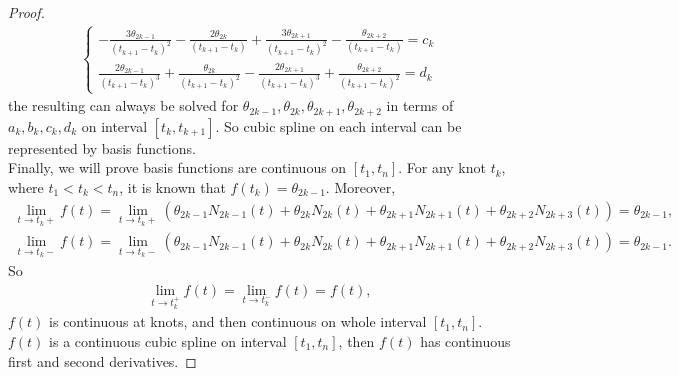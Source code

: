 \begin{proof}
\begin{align*}
\begin{cases}
-\frac{3\theta_{2k-1}}{(t_{k+1}-t_{k})^2} -\frac{2\theta_{2k}}{(t_{k+1}-t_{k})} +\frac{3\theta_{2k+1}}{(t_{k+1}-t_{k})^2} - \frac{\theta_{2k+2}}{(t_{k+1}-t_{k})}=c_k\\
\frac{2\theta_{2k-1}}{(t_{k+1}-t_{k})^3} +\frac{\theta_{2k}}{(t_{k+1}-t_{k})^2} -\frac{2\theta_{2k+1}}{(t_{k+1}-t_{k})^3} +\frac{\theta_{2k+2}}{(t_{k+1}-t_{k})^2}=d_k
\end{cases}
\end{align*}
the resulting can always be solved for $\theta_{2k-1}, \theta_{2k},\theta_{2k+1},\theta_{2k+2}$ in terms of $a_k,b_k,c_k,d_k$ on interval $[t_k, t_{k+1}]$. So cubic spline on each interval can be represented by basis functions. \\

Finally, we will prove basis functions are continuous on $[t_1, t_n]$. For any knot $t_k$, where $t_1< t_k <t_n$, it is known that $f(t_k)=\theta_{2k-1}$. Moreover, 
\begin{align*}
\lim\limits_{t\rightarrow t_k+} f(t) = \lim\limits_{t\rightarrow t_k+} (\theta_{2k-1}N_{2k-1}(t)+\theta_{2k}N_{2k}(t)+\theta_{2k+1}N_{2k+1}(t)+\theta_{2k+2}N_{2k+3}(t))=\theta_{2k-1},\\
\lim\limits_{t\rightarrow t_k-} f(t) = \lim\limits_{t\rightarrow t_k-} (\theta_{2k-1}N_{2k-1}(t)+\theta_{2k}N_{2k}(t)+\theta_{2k+1}N_{2k+1}(t)+\theta_{2k+2}N_{2k+3}(t))=\theta_{2k-1}.
\end{align*}
So
\begin{align*}
\lim\limits_{t\rightarrow t_k^+} f(t) =\lim\limits_{t\rightarrow t_k^-} f(t) =f(t),
\end{align*}
$f(t)$ is continuous at knots, and then continuous on whole interval $[t_1,t_n]$.
$f(t)$ is a continuous cubic spline on interval $[t_1,t_n]$, then $f(t)$ has continuous first and second derivatives.
\end{proof}

